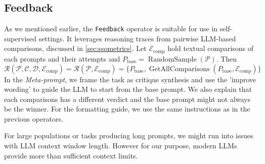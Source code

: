 \subsection{Feedback}
As we mentioned earlier, the \texttt{Feedback} operator is suitable for use in self-supervised settings.
It leverages reasoning traces from pairwise LLM-based comparisons, discussed in \ref{sec:ssometrics}. 
Let $\mathcal{E}_{\text{comp}}$ hold textual comparisons of each prompts and their attempts and
$P_{\text{base}} = \operatorname{RandomSample}(\mathcal{P})$. Then
\begin{equation}
    \mathcal{R}(\mathcal{P}, \mathcal{C}, \mathcal{D}, \mathcal{E}_{\text{comp}}) = \mathcal{R}(\mathcal{P}, \mathcal{E}_{\text{comp}}) = \{P_{\text{base}}, \operatorname{GetAllComparisons}(P_{\text{base}}, \mathcal{E}_{\text{comp}})\}
\end{equation}
In the \textit{Meta-prompt}, we frame the task as critique synthesis and use the 'improve wording' to guide the LLM to start from the base prompt.
We also explain that each comparisons has a different verdict and the base prompt might not always be the winner. For the formatting guide, we use the same instructions
as in the previous operators.

For large populations or tasks producing long prompts, we might run into issues with LLM context window length. 
However for our purpose, modern LLMs provide more than sufficient context limits. 




